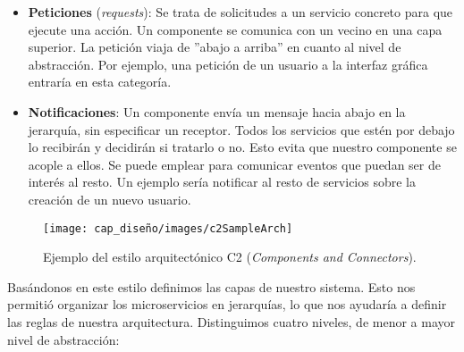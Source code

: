 \begin{itemize}
  \item \textbf{Peticiones} (\emph{requests}): Se trata de solicitudes a un servicio concreto para que ejecute una acción. Un componente se comunica con un vecino en una capa superior. La petición viaja de ''abajo a arriba'' en cuanto al nivel de abstracción. Por ejemplo, una petición de un usuario a la interfaz gráfica entraría en esta categoría.

  \item \textbf{Notificaciones}: Un componente envía un mensaje hacia abajo en la jerarquía, sin especificar un receptor. Todos los servicios que estén por debajo lo recibirán y decidirán si tratarlo o no. Esto evita que nuestro componente se acople a ellos. Se puede emplear para comunicar eventos que puedan ser de interés al resto. Un ejemplo sería notificar al resto de servicios sobre la creación de un nuevo usuario.
\end{itemize}

\begin{figure}[htb]
  \centering
  \texttt{[image: cap\_diseño/images/c2SampleArch]}
  \caption[Ejemplo del estilo arquitectónico C2 (\emph{Components and Connectors})]{Ejemplo del estilo arquitectónico C2 (\emph{Components and Connectors}). \cite{UCISoftwareArchitecture}}
  \label{fig:C2-arch-example}
\end{figure}

Basándonos en este estilo definimos las capas de nuestro sistema. Esto nos permitió organizar los microservicios en jerarquías, lo que nos ayudaría a definir las reglas de nuestra arquitectura. Distinguimos cuatro niveles, de menor a mayor nivel de abstracción:


